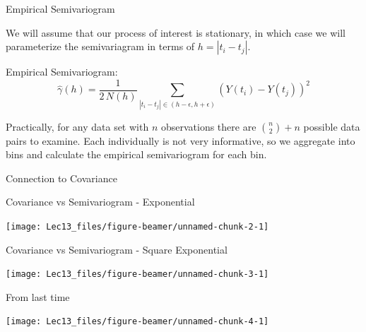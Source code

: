 \documentclass[11pt,ignorenonframetext,]{beamer}
\begin{document}
\begin{frame}[t]{Empirical Semivariogram}
\protect\hypertarget{empirical-semivariogram}{}

We will assume that our process of interest is stationary, in which case
we will parameterize the semivariagram in terms of \(h = |t_i - t_j|\).

\vspace{3mm}

Empirical Semivariogram:
\[ \hat{\gamma}(h) = \frac{1}{2 \, N(h)} \sum_{|t_i-t_j| \in (h-\epsilon,h+\epsilon)} (Y(t_i) - Y(t_j))^2 \]

\pause

Practically, for any data set with \(n\) observations there are
\({n \choose 2} + n\) possible data pairs to examine. Each individually
is not very informative, so we aggregate into bins and calculate the
empirical semivariogram for each bin.

\end{frame}

\begin{frame}{Connection to Covariance}
\protect\hypertarget{connection-to-covariance}{}

\end{frame}

\begin{frame}{Covariance vs Semivariogram - Exponential}
\protect\hypertarget{covariance-vs-semivariogram---exponential}{}

\begin{center}\texttt{[image: Lec13\_files/figure-beamer/unnamed-chunk-2-1]} \end{center}

\end{frame}

\begin{frame}{Covariance vs Semivariogram - Square Exponential}
\protect\hypertarget{covariance-vs-semivariogram---square-exponential}{}

\begin{center}\texttt{[image: Lec13\_files/figure-beamer/unnamed-chunk-3-1]} \end{center}

\end{frame}

\begin{frame}{From last time}
\protect\hypertarget{from-last-time}{}

\begin{center}\texttt{[image: Lec13\_files/figure-beamer/unnamed-chunk-4-1]} \end{center}

\end{frame}
\end{document}
